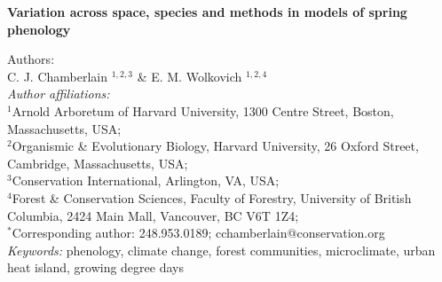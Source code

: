 \documentclass{article}\usepackage[]{graphicx}\usepackage[]{color}
\begin{document}
\noindent\textbf{\Large{Variation across space, species and methods in models of spring phenology}}

\noindent Authors:\\
C. J. Chamberlain $^{1,2,3}$ \& E. M. Wolkovich $^{1,2,4}$
\vspace{2ex}\\
\emph{Author affiliations:}\\
$^{1}$Arnold Arboretum of Harvard University, 1300 Centre Street, Boston, Massachusetts, USA; \\
$^{2}$Organismic \& Evolutionary Biology, Harvard University, 26 Oxford Street, Cambridge, Massachusetts, USA; \\
$^{3}$Conservation International, Arlington, VA, USA;\\
$^{4}$Forest \& Conservation Sciences, Faculty of Forestry, University of British Columbia, 2424 Main Mall, Vancouver, BC V6T 1Z4;\\
\vspace{2ex}
$^*$Corresponding author: 248.953.0189; cchamberlain@conservation.org\\

\noindent \emph{Keywords:} phenology, climate change, forest communities, microclimate, urban heat island, growing degree days\\

\renewcommand{\thetable}{\arabic{table}}
\renewcommand{\thefigure}{\arabic{figure}}
\renewcommand{\labelitemi}{$-$}



\end{document}
